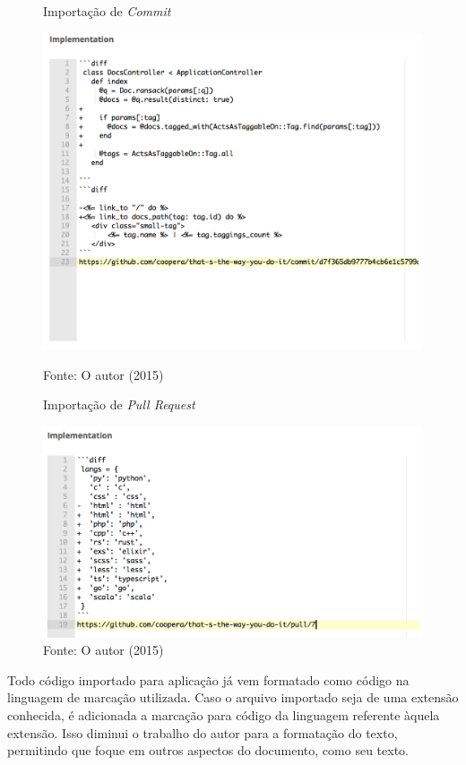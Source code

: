 \begin{figure}[ht]
	\centering
    \caption{Importação de \textit{Commit}}
    \includegraphics[width=13cm]{Imagens/import-commit.png}
		\label{fig:doc-import-4}
	\caption*{Fonte: O autor (2015)}
\end{figure}

\clearpage

\begin{figure}[ht]
	\centering
    \caption{Importação de \textit{Pull Request}}
    \includegraphics[width=13cm]{Imagens/import-pr.png}
	\caption*{Fonte: O autor (2015)}
\end{figure}

Todo código importado para aplicação já vem formatado como código na linguagem de marcação utilizada. Caso o arquivo importado seja de uma extensão conhecida, é adicionada a marcação para código da linguagem referente àquela extensão. Isso diminui o trabalho do autor para a formatação do texto, permitindo que foque em outros aspectos do documento, como seu texto.

